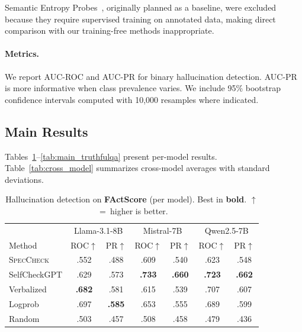 \documentclass{article}
\newcommand{\speccheck}{\textsc{SpecCheck}}
\begin{document}
Semantic Entropy Probes~\citep{kossen2024semantic}, originally planned as a baseline, were excluded because they require supervised training on annotated data, making direct comparison with our training-free methods inappropriate.

\paragraph{Metrics.}
We report AUC-ROC and AUC-PR for binary hallucination detection.
AUC-PR is more informative when class prevalence varies.
We include 95\% bootstrap confidence intervals computed with 10,000 resamples where indicated.

\subsection{Main Results}

Tables~\ref{tab:main_factscore}--\ref{tab:main_truthfulqa} present per-model results.
Table~\ref{tab:cross_model} summarizes cross-model averages with standard deviations.

\begin{table}[t]
\centering
\caption{Hallucination detection on \textbf{FActScore} (per model). Best in \textbf{bold}. $\uparrow$~=~higher is better.}
\label{tab:main_factscore}
\begin{tabular}{lcccccc}
\toprule
& \multicolumn{2}{c}{Llama-3.1-8B} & \multicolumn{2}{c}{Mistral-7B} & \multicolumn{2}{c}{Qwen2.5-7B} \\
Method & ROC$\uparrow$ & PR$\uparrow$ & ROC$\uparrow$ & PR$\uparrow$ & ROC$\uparrow$ & PR$\uparrow$ \\
\midrule
\speccheck{} & .552 & .488 & .609 & .540 & .623 & .548 \\
SelfCheckGPT & .629 & .573 & \textbf{.733} & \textbf{.660} & \textbf{.723} & \textbf{.662} \\
Verbalized & \textbf{.682} & .581 & .615 & .539 & .707 & .607 \\
Logprob & .697 & \textbf{.585} & .653 & .555 & .689 & .599 \\
Random & .503 & .457 & .508 & .458 & .479 & .436 \\
\bottomrule
\end{tabular}
\end{table}
\end{document}
